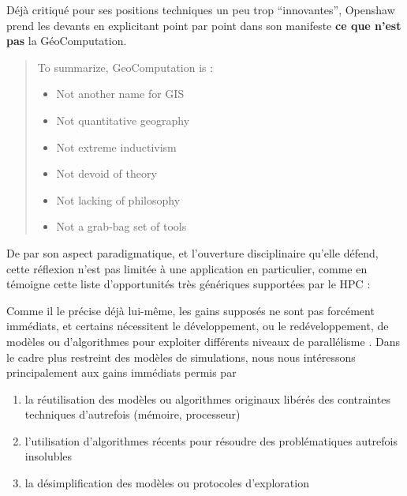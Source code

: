 Déjà critiqué pour ses positions techniques un peu trop \enquote{innovantes}, Openshaw prend les devants en explicitant point par point dans son manifeste \textbf{ce que n'est pas} la GéoComputation.

\foreignblockquote{english}[{\cite[11]{Openshaw2000}}]{To summarize, GeoComputation is :
\begin{itemize}
\item Not another name for GIS
\item Not quantitative geography
\item Not extreme inductivism
\item Not devoid of theory
\item Not lacking of philosophy
\item Not a grab-bag set of tools
\end{itemize}}

De par son aspect paradigmatique, et l'ouverture disciplinaire qu'elle défend, cette réflexion n'est pas limitée à une application en particulier, comme en témoigne cette liste d'opportunités très génériques supportées par le HPC :


Comme il le précise déjà lui-même, les gains supposés ne sont pas forcément immédiats, et certains nécessitent le développement, ou le redéveloppement, de modèles ou d'algorithmes pour exploiter différents niveaux de parallélisme . Dans le cadre plus restreint des modèles de simulations, nous nous intéressons principalement aux gains immédiats permis par \begin{enumerate}[label=(\alph*)]  \item la réutilisation des modèles ou algorithmes originaux libérés des contraintes techniques d'autrefois (mémoire, processeur)  \item l'utilisation d'algorithmes récents pour résoudre des problématiques autrefois insolubles \item la désimplification des modèles ou protocoles d'exploration \end{enumerate}

